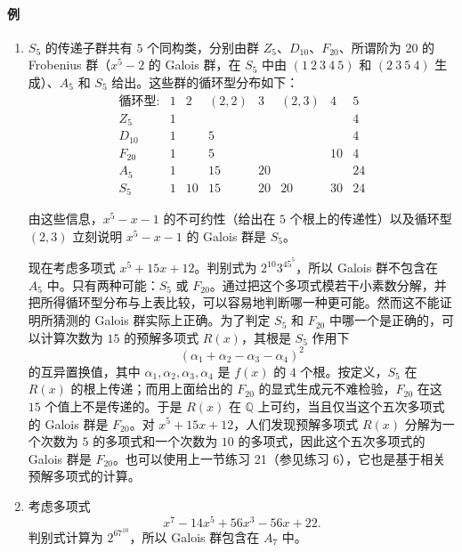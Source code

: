 \paragraph{例}
\begin{enumerate}
\item $S_5$ 的传递子群共有 $5$ 个同构类，分别由群 $Z_5$、$D_{10}$、$F_{20}$、所谓阶为 $20$ 的 Frobenius 群（$x^5-2$ 的 Galois 群，在 $S_5$ 中由 $(1\ 2\ 3\ 4\ 5)$ 和 $(2\ 3\ 5\ 4)$ 生成）、$A_5$ 和 $S_5$ 给出。这些群的循环型分布如下：
\[
\begin{array}{c|rrrrrrr}
\text{循环型:} & 1 & 2 & (2,2) & 3 & (2,3) & 4 & 5\\ \hline
Z_5    & 1 &   &    &    &    &    & 4\\
D_{10} & 1 &   & 5  &    &    &    & 4\\
F_{20} & 1 &   & 5  &    &    & 10 & 4\\
A_5    & 1 &   & 15 & 20 &    &    & 24\\
S_5    & 1 &10 & 15 & 20 & 20 & 30 & 24
\end{array}
\]

由这些信息，$x^5-x-1$ 的不可约性（给出在 $5$ 个根上的传递性）以及循环型 $(2,3)$ 立刻说明 $x^5-x-1$ 的 Galois 群是 $S_5$。

现在考虑多项式 $x^5+15x+12$。判别式为 $2^{10}3^45^5$，所以 Galois 群不包含在 $A_5$ 中。只有两种可能：$S_5$ 或 $F_{20}$。通过把这个多项式模若干小素数分解，并把所得循环型分布与上表比较，可以容易地判断哪一种更可能。然而这不能证明所猜测的 Galois 群实际上正确。为了判定 $S_5$ 和 $F_{20}$ 中哪一个是正确的，可以计算次数为 $15$ 的预解多项式 $R(x)$，其根是 $S_5$ 作用下
\[
(\alpha_1+\alpha_2-\alpha_3-\alpha_4)^2
\]
的互异置换值，其中 $\alpha_1,\alpha_2,\alpha_3,\alpha_4$ 是 $f(x)$ 的 $4$ 个根。按定义，$S_5$ 在 $R(x)$ 的根上传递；而用上面给出的 $F_{20}$ 的显式生成元不难检验，$F_{20}$ 在这 $15$ 个值上不是传递的。于是 $R(x)$ 在 $\mathbb Q$ 上可约，当且仅当这个五次多项式的 Galois 群是 $F_{20}$。对 $x^5+15x+12$，人们发现预解多项式 $R(x)$ 分解为一个次数为 $5$ 的多项式和一个次数为 $10$ 的多项式，因此这个五次多项式的 Galois 群是 $F_{20}$。也可以使用上一节练习 21（参见练习 6），它也是基于相关预解多项式的计算。

\item 考虑多项式
\[
x^7-14x^5+56x^3-56x+22.
\]
判别式计算为 $2^67^{10}$，所以 Galois 群包含在 $A_7$ 中。


\end{enumerate}
